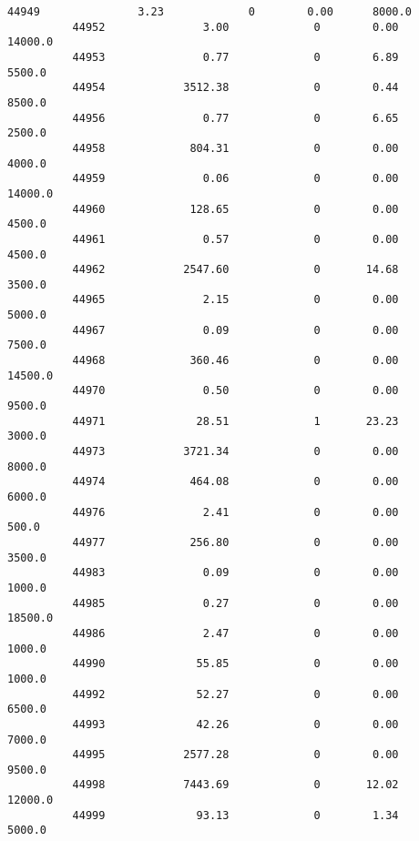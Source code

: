\documentclass[11pt]{article}
\begin{document}
\begin{Verbatim}[commandchars=\\\{\}]
          44949               3.23             0        0.00      8000.0   
          44952               3.00             0        0.00     14000.0   
          44953               0.77             0        6.89      5500.0   
          44954            3512.38             0        0.44      8500.0   
          44956               0.77             0        6.65      2500.0   
          44958             804.31             0        0.00      4000.0   
          44959               0.06             0        0.00     14000.0   
          44960             128.65             0        0.00      4500.0   
          44961               0.57             0        0.00      4500.0   
          44962            2547.60             0       14.68      3500.0   
          44965               2.15             0        0.00      5000.0   
          44967               0.09             0        0.00      7500.0   
          44968             360.46             0        0.00     14500.0   
          44970               0.50             0        0.00      9500.0   
          44971              28.51             1       23.23      3000.0   
          44973            3721.34             0        0.00      8000.0   
          44974             464.08             0        0.00      6000.0   
          44976               2.41             0        0.00       500.0   
          44977             256.80             0        0.00      3500.0   
          44983               0.09             0        0.00      1000.0   
          44985               0.27             0        0.00     18500.0   
          44986               2.47             0        0.00      1000.0   
          44990              55.85             0        0.00      1000.0   
          44992              52.27             0        0.00      6500.0   
          44993              42.26             0        0.00      7000.0   
          44995            2577.28             0        0.00      9500.0   
          44998            7443.69             0       12.02     12000.0   
          44999              93.13             0        1.34      5000.0   
          

\end{Verbatim}
\end{document}
